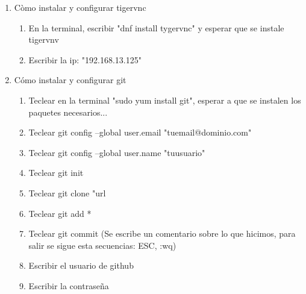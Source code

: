 \documentclass[letterpaper, 12pt, oneside]{article}%
\begin{document}
\begin{enumerate}
\begin{itemize}
				
	\end{itemize}%
	\item Còmo instalar y configurar tigervnc
		\begin{enumerate}
			\item En la terminal, escribir "dnf install tygervnc" y esperar que se instale tigervnv
			\item Escribir la ip: "192.168.13.125"
		\end{enumerate}
	\item Cómo instalar y configurar git
		\begin{enumerate}
			\item Teclear en la terminal "sudo yum install git", esperar a que se instalen los paquetes necesarios...
			\item Teclear  git config --global user.email "tuemail@dominio.com"
			\item Teclear  git config --global user.name "tuusuario"      
			\item Teclear  git init
			\item Teclear  git clone "url
			\item Teclear git add *
			\item Teclear git commit (Se escribe un comentario sobre lo que hicimos, para salir se sigue esta secuencias: ESC, :wq)
			\item Escribir el usuario de github
			\item Escribir la contraseña
		\end{enumerate}
	
	
	
	
\end{enumerate}%
	
\end{document}
